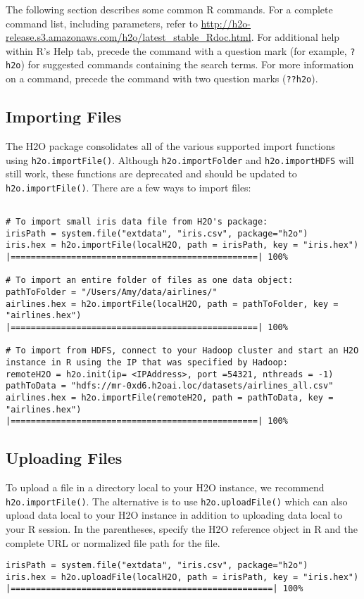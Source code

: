 The following section describes some common R commands. For a complete command list, including parameters, refer to {\url{http://h2o-release.s3.amazonaws.com/h2o/latest_stable_Rdoc.html}}.
For additional help within R's Help tab, precede the command with a question mark (for example, {\texttt{?h2o}}) for suggested commands containing the search terms. For more information on a command, precede the command with two question marks ({\texttt{??h2o}}). 

\subsection{Importing Files}

The H2O package consolidates all of the various supported import functions using {\texttt{h2o.importFile()}}. Although {\texttt{h2o.importFolder}} and {\texttt{h2o.importHDFS}} will still work, these functions are deprecated and should be updated to {\texttt{h2o.importFile()}}. There are a few ways to import files: 

\begin{lstlisting}[style=R]

# To import small iris data file from H2O's package:
irisPath = system.file("extdata", "iris.csv", package="h2o")
iris.hex = h2o.importFile(localH2O, path = irisPath, key = "iris.hex")
|=================================================| 100%

# To import an entire folder of files as one data object:
pathToFolder = "/Users/Amy/data/airlines/"
airlines.hex = h2o.importFile(localH2O, path = pathToFolder, key = "airlines.hex")
|=================================================| 100%

# To import from HDFS, connect to your Hadoop cluster and start an H2O instance in R using the IP that was specified by Hadoop:
remoteH2O = h2o.init(ip= <IPAddress>, port =54321, nthreads = -1)
pathToData = "hdfs://mr-0xd6.h2oai.loc/datasets/airlines_all.csv"
airlines.hex = h2o.importFile(remoteH2O, path = pathToData, key = "airlines.hex")
|=================================================| 100%
\end{lstlisting}


\subsection{Uploading Files}

To upload a file in a directory local to your H2O instance, we recommend {\texttt{h2o.importFile()}}. The alternative is to use {\texttt{h2o.uploadFile()}} which can also upload data local to your H2O instance in addition to uploading data local to your R session. In the parentheses, specify the H2O reference object in R and the complete URL or normalized file path for the file.
\begin{lstlisting}[style=R]
irisPath = system.file("extdata", "iris.csv", package="h2o")
iris.hex = h2o.uploadFile(localH2O, path = irisPath, key = "iris.hex")
|====================================================| 100% 
\end{lstlisting}


